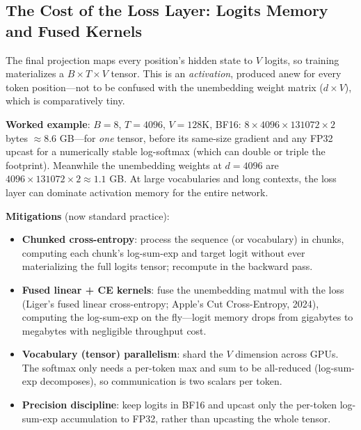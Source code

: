\subsection{The Cost of the Loss Layer: Logits Memory and Fused Kernels}

The final projection maps every position's hidden state to $V$ logits, so training materializes a $B \times T \times V$ tensor. This is an \textit{activation}, produced anew for every token position---not to be confused with the unembedding weight matrix ($d \times V$), which is comparatively tiny.

\textbf{Worked example}: $B = 8$, $T = 4096$, $V = 128\text{K}$, BF16: $8 \times 4096 \times 131072 \times 2$ bytes $\approx 8.6$ GB---for \textit{one} tensor, before its same-size gradient and any FP32 upcast for a numerically stable log-softmax (which can double or triple the footprint). Meanwhile the unembedding weights at $d = 4096$ are $4096 \times 131072 \times 2 \approx 1.1$ GB. At large vocabularies and long contexts, the loss layer can dominate activation memory for the entire network.

\textbf{Mitigations} (now standard practice):
\begin{itemize}
    \item \textbf{Chunked cross-entropy}: process the sequence (or vocabulary) in chunks, computing each chunk's log-sum-exp and target logit without ever materializing the full logits tensor; recompute in the backward pass.
    \item \textbf{Fused linear + CE kernels}: fuse the unembedding matmul with the loss (Liger's fused linear cross-entropy; Apple's Cut Cross-Entropy, 2024), computing the log-sum-exp on the fly---logit memory drops from gigabytes to megabytes with negligible throughput cost.
    \item \textbf{Vocabulary (tensor) parallelism}: shard the $V$ dimension across GPUs. The softmax only needs a per-token max and sum to be all-reduced (log-sum-exp decomposes), so communication is two scalars per token.
    \item \textbf{Precision discipline}: keep logits in BF16 and upcast only the per-token log-sum-exp accumulation to FP32, rather than upcasting the whole tensor.
\end{itemize}

